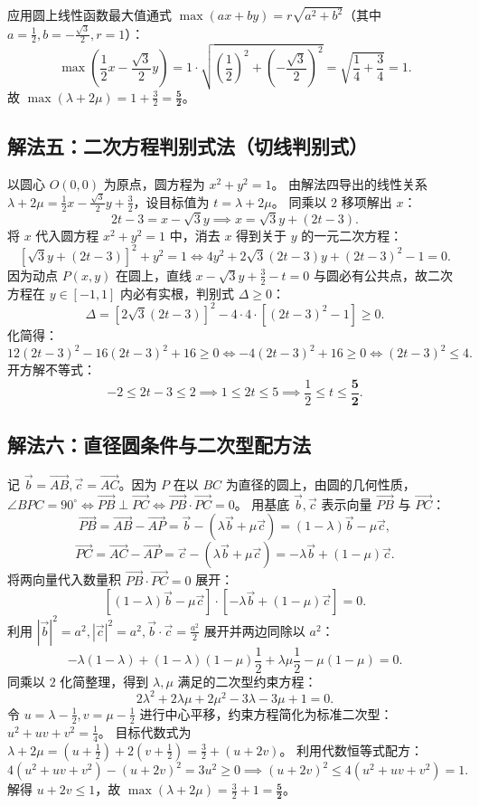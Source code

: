 \documentclass[11pt,a4paper]{ctexart}
\newcommand{\vect}[1]{\overrightarrow{#1}}
\begin{document}
应用圆上线性函数最大值通式 \(\max(ax+by) = r\sqrt{a^2+b^2}\)（其中 \(a=\frac{1}{2}, b=-\frac{\sqrt{3}}{2}, r=1\)）：
\[
\max\left(\frac{1}{2}x - \frac{\sqrt{3}}{2}y\right) = 1 \cdot \sqrt{\left(\frac{1}{2}\right)^2 + \left(-\frac{\sqrt{3}}{2}\right)^2} = \sqrt{\frac{1}{4} + \frac{3}{4}} = 1.
\]
故 \(\max(\lambda+2\mu) = 1 + \frac{3}{2} = \mathbf{\frac{5}{2}}\)。

\vspace{1em}
\subsection*{解法五：二次方程判别式法（切线判别式）}
以圆心 \(O(0,0)\) 为原点，圆方程为 \(x^2+y^2=1\)。
由解法四导出的线性关系 \(\lambda+2\mu = \frac{1}{2}x - \frac{\sqrt{3}}{2}y + \frac{3}{2}\)，设目标值为 \(t = \lambda+2\mu\)。
同乘以 \(2\) 移项解出 \(x\)：
\[
2t - 3 = x - \sqrt{3}y \implies x = \sqrt{3}y + (2t - 3).
\]
将 \(x\) 代入圆方程 \(x^2+y^2=1\) 中，消去 \(x\) 得到关于 \(y\) 的一元二次方程：
\[
\left[\sqrt{3}y + (2t - 3)\right]^2 + y^2 = 1 \iff 4y^2 + 2\sqrt{3}(2t - 3)y + (2t - 3)^2 - 1 = 0.
\]
因为动点 \(P(x,y)\) 在圆上，直线 \(x - \sqrt{3}y + \frac{3}{2} - t = 0\) 与圆必有公共点，故二次方程在 \(y \in [-1,1]\) 内必有实根，判别式 \(\Delta \ge 0\)：
\[
\Delta = \left[2\sqrt{3}(2t - 3)\right]^2 - 4 \cdot 4 \cdot \left[(2t - 3)^2 - 1\right] \ge 0.
\]
化简得：
\[
12(2t - 3)^2 - 16(2t - 3)^2 + 16 \ge 0 \iff -4(2t - 3)^2 + 16 \ge 0 \iff (2t - 3)^2 \le 4.
\]
开方解不等式：
\[
-2 \le 2t - 3 \le 2 \implies 1 \le 2t \le 5 \implies \frac{1}{2} \le t \le \mathbf{\frac{5}{2}}.
\]

\vspace{1em}
\subsection*{解法六：直径圆条件与二次型配方法}
记 \(\vec b = \vect{AB}, \vec c = \vect{AC}\)。因为 \(P\) 在以 \(BC\) 为直径的圆上，由圆的几何性质，\(\angle BPC = 90^\circ \iff \vect{PB}\perp\vect{PC} \iff \vect{PB}\cdot\vect{PC} = 0\)。
用基底 \(\vec b, \vec c\) 表示向量 \(\vect{PB}\) 与 \(\vect{PC}\)：
\[
\vect{PB} = \vect{AB} - \vect{AP} = \vec b - (\lambda\vec b + \mu\vec c) = (1-\lambda)\vec b - \mu\vec c,
\]
\[
\vect{PC} = \vect{AC} - \vect{AP} = \vec c - (\lambda\vec b + \mu\vec c) = -\lambda\vec b + (1-\mu)\vec c.
\]
将两向量代入数量积 \(\vect{PB}\cdot\vect{PC} = 0\) 展开：
\[
[(1-\lambda)\vec b - \mu\vec c] \cdot [-\lambda\vec b + (1-\mu)\vec c] = 0.
\]
利用 \(|\vec b|^2=a^2, |\vec c|^2=a^2, \vec b\cdot\vec c = \frac{a^2}{2}\) 展开并两边同除以 \(a^2\)：
\[
-\lambda(1-\lambda) + (1-\lambda)(1-\mu)\frac{1}{2} + \lambda\mu\frac{1}{2} - \mu(1-\mu) = 0.
\]
同乘以 \(2\) 化简整理，得到 \(\lambda,\mu\) 满足的二次型约束方程：
\[
2\lambda^2 + 2\lambda\mu + 2\mu^2 - 3\lambda - 3\mu + 1 = 0.
\]
令 \(u = \lambda-\frac{1}{2}, v = \mu-\frac{1}{2}\) 进行中心平移，约束方程简化为标准二次型：\(u^2 + uv + v^2 = \frac{1}{4}\)。
目标代数式为 \(\lambda+2\mu = \left(u+\frac{1}{2}\right) + 2\left(v+\frac{1}{2}\right) = \frac{3}{2} + (u+2v)\)。
利用代数恒等式配方：
\[
4(u^2+uv+v^2) - (u+2v)^2 = 3u^2 \ge 0 \implies (u+2v)^2 \le 4(u^2+uv+v^2) = 1.
\]
解得 \(u+2v \le 1\)，故 \(\max(\lambda+2\mu) = \frac{3}{2} + 1 = \mathbf{\frac{5}{2}}\)。
\end{document}
